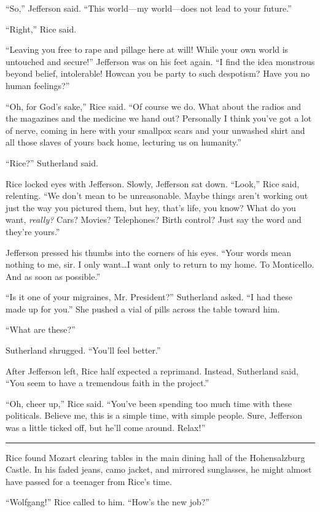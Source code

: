 ``So,'' Jefferson said. ``This world—my world—does not lead to your future.''

``Right,'' Rice said.

``Leaving you free to rape and pillage here at will! While your own world is untouched and secure!'' Jefferson was on his feet again. ``I find the idea monstrous beyond belief, intolerable! Howcan you be party to such despotism? Have you no human feelings?''

``Oh, for God's sake,'' Rice said. ``Of course we do. What about the radios and the magazines and the medicine we hand out? Personally I think you've got a lot of nerve, coming in here with your smallpox scars and your unwashed shirt and all those slaves of yours back home, lecturing us on humanity.''

``Rice?'' Sutherland said.

Rice locked eyes with Jefferson. Slowly, Jefferson sat down. ``Look,'' Rice said, relenting. ``We don't mean to be unreasonable. Maybe things aren't working out just the way you pictured them, but hey, that's life, you know? What do you want, \textit{really?} Cars? Movies? Telephones? Birth control? Just say the word and they're yours.''

Jefferson pressed his thumbs into the corners of his eyes. ``Your words mean nothing to me, sir. I only want\ldots I want only to return to my home. To Monticello. And as soon as possible.''

``Is it one of your migraines, Mr. President?'' Sutherland asked. ``I had these made up for you.'' She pushed a vial of pills across the table toward him.

``What are these?''

Sutherland shrugged. ``You'll feel better.''

After Jefferson left, Rice half expected a reprimand. Instead, Sutherland said, ``You seem to have a tremendous faith in the project.''

``Oh, cheer up,'' Rice said. ``You've been spending too much time with these politicals. Believe me, this is a simple time, with simple people. Sure, Jefferson was a little ticked off, but he'll come around. Relax!''

\fancybreak{* * *}

Rice found Mozart clearing tables in the main dining hall of the Hohensalzburg Castle. In his faded jeans, camo jacket, and mirrored sunglasses, he might almost have passed for a teenager from Rice's time.

``Wolfgang!'' Rice called to him. ``How's the new job?''

